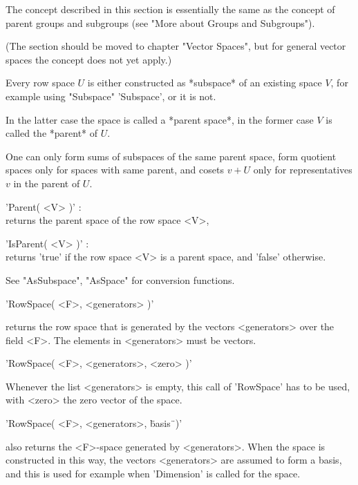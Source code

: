
The concept described in this section is essentially the same as the concept
of parent groups and subgroups (see "More about Groups and Subgroups").

(The section should be moved to chapter "Vector Spaces", but for general
vector spaces the concept does not yet apply.)

Every row space $U$ is either constructed as *subspace* of an existing space
$V$, for example using "Subspace" 'Subspace', or it is not.

In the latter case the space is called a *parent space*, in the former case  
$V$ is called the *parent* of $U$.

One can only form sums of subspaces of the same parent space, form quotient
spaces only for spaces with same parent, and cosets $v + U$ only for
representatives $v$ in the parent of $U$.

'Parent( <V> )' : \\
    returns the parent space of the row space <V>,

'IsParent( <V> )' : \\
    returns 'true' if the row space <V> is a parent space,
    and 'false' otherwise.

See "AsSubspace", "AsSpace" for conversion functions.


'RowSpace( <F>, <generators> )'

returns the row space that is generated by the vectors <generators> over
the field <F>.  The elements in <generators> must be {\GAP} vectors.

\vspace{5mm}

'RowSpace( <F>, <generators>, <zero> )'

Whenever the list <generators> is empty,  this call of 'RowSpace'  has to
be used, with <zero> the zero vector of the space.

\vspace{5mm}

'RowSpace( <F>, <generators>, \"basis\"\ )'

also returns the <F>-space generated by <generators>.  When the space is
constructed in this way, the vectors <generators> are assumed to form a
basis, and this is used for example when 'Dimension' is called for the
space.


